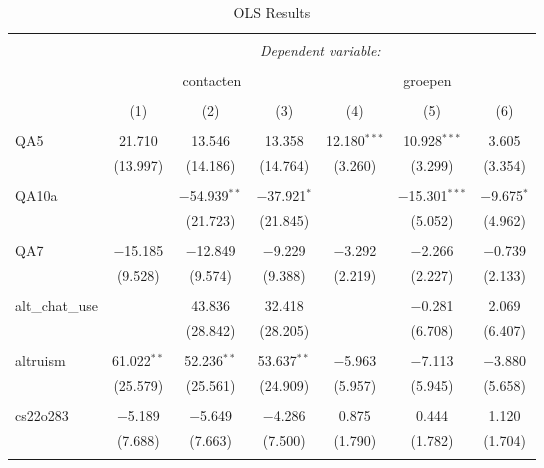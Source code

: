 
\begin{table}[!htbp] \centering 
  \caption{OLS Results} 
  \label{} 
\begin{tabular}{@{\extracolsep{5pt}}lcccccc} 
\\[-1.8ex]\hline 
\hline \\[-1.8ex] 
 & \multicolumn{6}{c}{\textit{Dependent variable:}} \\ 
\cline{2-7} 
\\[-1.8ex] & \multicolumn{3}{c}{contacten} & \multicolumn{3}{c}{groepen} \\ 
\\[-1.8ex] & (1) & (2) & (3) & (4) & (5) & (6)\\ 
\hline \\[-1.8ex] 
 QA5 & 21.710 & 13.546 & 13.358 & 12.180$^{***}$ & 10.928$^{***}$ & 3.605 \\ 
  & (13.997) & (14.186) & (14.764) & (3.260) & (3.299) & (3.354) \\ 
  & & & & & & \\ 
 QA10a &  & $-$54.939$^{**}$ & $-$37.921$^{*}$ &  & $-$15.301$^{***}$ & $-$9.675$^{*}$ \\ 
  &  & (21.723) & (21.845) &  & (5.052) & (4.962) \\ 
  & & & & & & \\ 
 QA7 & $-$15.185 & $-$12.849 & $-$9.229 & $-$3.292 & $-$2.266 & $-$0.739 \\ 
  & (9.528) & (9.574) & (9.388) & (2.219) & (2.227) & (2.133) \\ 
  & & & & & & \\ 
 alt\_chat\_use &  & 43.836 & 32.418 &  & $-$0.281 & 2.069 \\ 
  &  & (28.842) & (28.205) &  & (6.708) & (6.407) \\ 
  & & & & & & \\ 
 altruism & 61.022$^{**}$ & 52.236$^{**}$ & 53.637$^{**}$ & $-$5.963 & $-$7.113 & $-$3.880 \\ 
  & (25.579) & (25.561) & (24.909) & (5.957) & (5.945) & (5.658) \\ 
  & & & & & & \\ 
 cs22o283 & $-$5.189 & $-$5.649 & $-$4.286 & 0.875 & 0.444 & 1.120 \\ 
  & (7.688) & (7.663) & (7.500) & (1.790) & (1.782) & (1.704) \\ 
  & & & & & & \\ 

\end{tabular}
\end{table}
